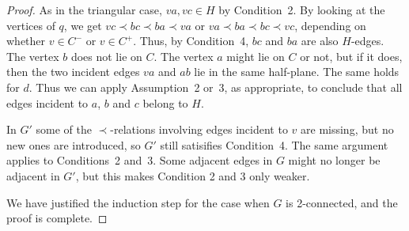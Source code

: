 \documentclass{patmorin}
\begin{document}
\begin{proof}
As in the triangular case, $va,vc\in H$ by Condition~2.
By looking at the vertices of $q$, we get
$vc \prec bc\prec ba\prec va$ or 
$va \prec ba\prec bc\prec vc$,
 depending on whether $v\in C^-$ or
$v\in C^+$. 
Thus, by Condition~4, $bc$ and $ba$ are also $H$-edges.
The vertex $b$ does not lie on $C$.
The vertex $a$ might lie on $C$ or not, but if it does,
then the two incident edges $va$ and $ab$ lie in the same half-plane.
 The same holds for $d$.
Thus we can apply Assumption~2 or~3, as appropriate,
 to conclude that all edges incident
to $a$, $b$ and $c$ belong to $H$.


   In $G'$ some of the $\prec$-relations involving edges incident
   to $v$ are missing, but no new ones are introduced, so $G'$ still
   satisifies Condition~4.
The same argument applies to
Conditions~2 and~3. Some adjacent edges in $G$ might no longer be adjacent
in $G'$, but this makes Condition 2 and 3 only weaker.

We have justified the induction step for the case when $G$ is
2-connected, and
   the proof is complete.
\end{proof}
\end{document}
